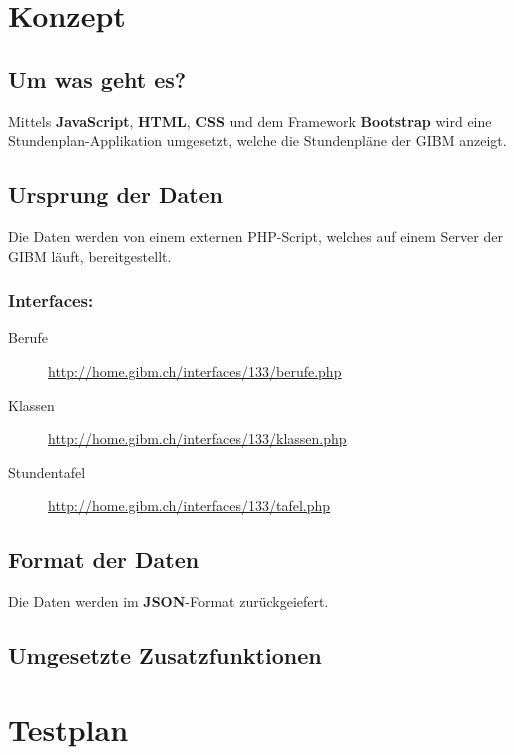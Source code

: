 \documentclass[11pt,a4paper,titlepage,portrait,ngerman,final]{scrartcl}
\title{\docTitle}
\subtitle{\docSubtitle}
\author{\large\scshape\docAuthor}
\date{\normalsize\scshape\docDate}
\begin{document}
\maketitle
\tableofcontents
\newpage
\section{Konzept}
\subsection{Um was geht es?}
Mittels \textbf{JavaScript}, \textbf{HTML}, \textbf{CSS} und dem Framework \textbf{Bootstrap} wird eine Stundenplan-Applikation umgesetzt, welche die Stundenpläne der GIBM anzeigt.

\subsection{Ursprung der Daten}
Die Daten werden von einem externen PHP-Script, welches auf einem Server der GIBM läuft, bereitgestellt.
\subsubsection*{Interfaces:}
\begin{description}
	\item[Berufe]{\url{http://home.gibm.ch/interfaces/133/berufe.php}}
	\item[Klassen]{\url{http://home.gibm.ch/interfaces/133/klassen.php}}
	\item[Stundentafel]{\url{http://home.gibm.ch/interfaces/133/tafel.php}}
\end{description}

\subsection{Format der Daten}
Die Daten werden im \textbf{JSON}-Format zurückgeiefert.
\subsection{Umgesetzte Zusatzfunktionen}
\section{Testplan}
\end{document}
